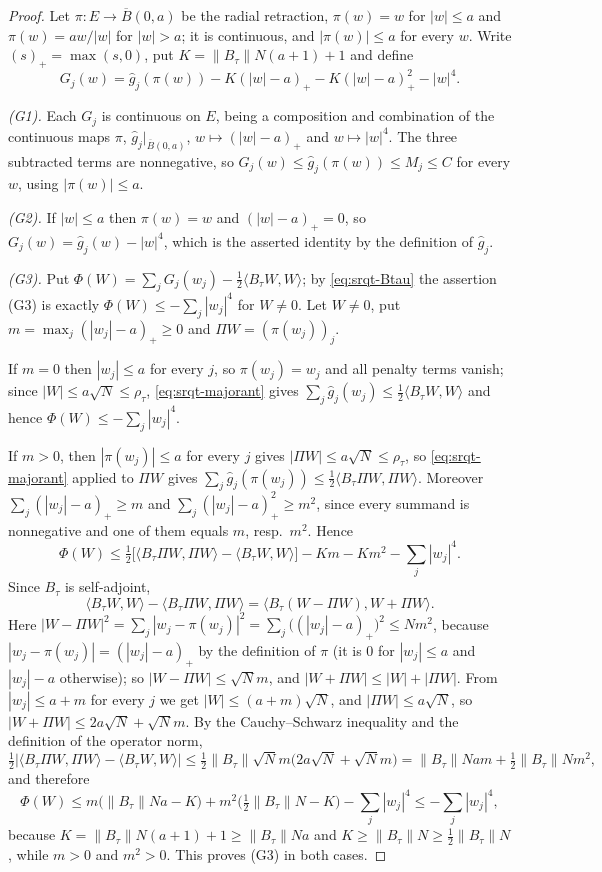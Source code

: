 \begin{proof}
Let $\pi:E\to\overline B(0,a)$ be the radial retraction, $\pi(w)=w$ for
$|w|\le a$ and $\pi(w)=aw/|w|$ for $|w|>a$; it is continuous, and
$|\pi(w)|\le a$ for every $w$. Write $(s)_+=\max(s,0)$, put
$K=\|B_\tau\|N(a+1)+1$ and define
\[
  G_j(w)=\widehat g_j(\pi(w))-K(|w|-a)_+-K(|w|-a)_+^2-|w|^4 .
\]

\emph{(G1).} Each $G_j$ is continuous on $E$, being a composition and
combination of the continuous maps $\pi$, $\widehat g_j|_{\overline B(0,a)}$,
$w\mapsto(|w|-a)_+$ and $w\mapsto|w|^4$. The three subtracted terms are
nonnegative, so
$G_j(w)\le\widehat g_j(\pi(w))\le M_j\le C$ for every $w$, using
$|\pi(w)|\le a$.

\emph{(G2).} If $|w|\le a$ then $\pi(w)=w$ and $(|w|-a)_+=0$, so
$G_j(w)=\widehat g_j(w)-|w|^4$, which is the asserted identity by the definition
of $\widehat g_j$.

\emph{(G3).} Put $\Phi(W)=\sum_jG_j(w_j)-\tfrac12\langle B_\tau W,W\rangle$; by
\eqref{eq:srqt-Btau} the assertion (G3) is exactly
$\Phi(W)\le-\sum_j|w_j|^4$ for $W\ne0$. Let $W\ne0$, put
$m=\max_j(|w_j|-a)_+\ge0$ and $\Pi W=(\pi(w_j))_j$.

If $m=0$ then $|w_j|\le a$ for every $j$, so $\pi(w_j)=w_j$ and all penalty
terms vanish; since $|W|\le a\sqrt N\le\rho_\tau$, \eqref{eq:srqt-majorant}
gives $\sum_j\widehat g_j(w_j)\le\tfrac12\langle B_\tau W,W\rangle$ and hence
$\Phi(W)\le-\sum_j|w_j|^4$.

If $m>0$, then $|\pi(w_j)|\le a$ for every $j$ gives
$|\Pi W|\le a\sqrt N\le\rho_\tau$, so \eqref{eq:srqt-majorant} applied to
$\Pi W$ gives
$\sum_j\widehat g_j(\pi(w_j))\le\tfrac12\langle B_\tau\Pi W,\Pi W\rangle$.
Moreover $\sum_j(|w_j|-a)_+\ge m$ and $\sum_j(|w_j|-a)_+^2\ge m^2$, since every
summand is nonnegative and one of them equals $m$, resp.\ $m^2$. Hence
\[
  \Phi(W)\le\tfrac12\bigl[\langle B_\tau\Pi W,\Pi W\rangle
     -\langle B_\tau W,W\rangle\bigr]-Km-Km^2-\sum_j|w_j|^4 .
\]
Since $B_\tau$ is self-adjoint,
\[
  \langle B_\tau W,W\rangle-\langle B_\tau\Pi W,\Pi W\rangle
   =\langle B_\tau(W-\Pi W),W+\Pi W\rangle .
\]
Here $|W-\Pi W|^2=\sum_j|w_j-\pi(w_j)|^2
=\sum_j\bigl((|w_j|-a)_+\bigr)^2\le Nm^2$, because
$|w_j-\pi(w_j)|=(|w_j|-a)_+$ by the definition of $\pi$ (it is $0$ for
$|w_j|\le a$ and $|w_j|-a$ otherwise); so $|W-\Pi W|\le\sqrt Nm$, and
$|W+\Pi W|\le|W|+|\Pi W|$. From $|w_j|\le a+m$ for every $j$ we get
$|W|\le(a+m)\sqrt N$, and $|\Pi W|\le a\sqrt N$, so
$|W+\Pi W|\le2a\sqrt N+\sqrt Nm$. By the Cauchy--Schwarz inequality and the
definition of the operator norm,
\[
  \tfrac12\bigl|\langle B_\tau\Pi W,\Pi W\rangle-\langle B_\tau W,W\rangle\bigr|
   \le\tfrac12\|B_\tau\|\sqrt Nm\bigl(2a\sqrt N+\sqrt Nm\bigr)
   =\|B_\tau\|Nam+\tfrac12\|B_\tau\|Nm^2,
\]
and therefore
\[
  \Phi(W)\le m\bigl(\|B_\tau\|Na-K\bigr)+m^2\bigl(\tfrac12\|B_\tau\|N-K\bigr)
     -\sum_j|w_j|^4\le-\sum_j|w_j|^4,
\]
because $K=\|B_\tau\|N(a+1)+1\ge\|B_\tau\|Na$ and
$K\ge\|B_\tau\|N\ge\tfrac12\|B_\tau\|N$, while $m>0$ and $m^2>0$. This proves
(G3) in both cases.
\end{proof}
